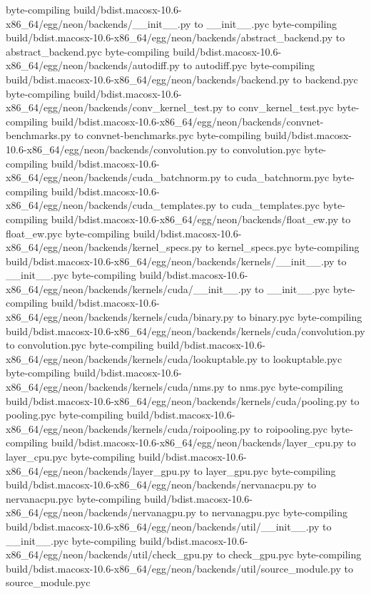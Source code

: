 byte-compiling build/bdist.macosx-10.6-x86_64/egg/neon/backends/__init__.py to __init__.pyc
byte-compiling build/bdist.macosx-10.6-x86_64/egg/neon/backends/abstract_backend.py to abstract_backend.pyc
byte-compiling build/bdist.macosx-10.6-x86_64/egg/neon/backends/autodiff.py to autodiff.pyc
byte-compiling build/bdist.macosx-10.6-x86_64/egg/neon/backends/backend.py to backend.pyc
byte-compiling build/bdist.macosx-10.6-x86_64/egg/neon/backends/conv_kernel_test.py to conv_kernel_test.pyc
byte-compiling build/bdist.macosx-10.6-x86_64/egg/neon/backends/convnet-benchmarks.py to convnet-benchmarks.pyc
byte-compiling build/bdist.macosx-10.6-x86_64/egg/neon/backends/convolution.py to convolution.pyc
byte-compiling build/bdist.macosx-10.6-x86_64/egg/neon/backends/cuda_batchnorm.py to cuda_batchnorm.pyc
byte-compiling build/bdist.macosx-10.6-x86_64/egg/neon/backends/cuda_templates.py to cuda_templates.pyc
byte-compiling build/bdist.macosx-10.6-x86_64/egg/neon/backends/float_ew.py to float_ew.pyc
byte-compiling build/bdist.macosx-10.6-x86_64/egg/neon/backends/kernel_specs.py to kernel_specs.pyc
byte-compiling build/bdist.macosx-10.6-x86_64/egg/neon/backends/kernels/__init__.py to __init__.pyc
byte-compiling build/bdist.macosx-10.6-x86_64/egg/neon/backends/kernels/cuda/__init__.py to __init__.pyc
byte-compiling build/bdist.macosx-10.6-x86_64/egg/neon/backends/kernels/cuda/binary.py to binary.pyc
byte-compiling build/bdist.macosx-10.6-x86_64/egg/neon/backends/kernels/cuda/convolution.py to convolution.pyc
byte-compiling build/bdist.macosx-10.6-x86_64/egg/neon/backends/kernels/cuda/lookuptable.py to lookuptable.pyc
byte-compiling build/bdist.macosx-10.6-x86_64/egg/neon/backends/kernels/cuda/nms.py to nms.pyc
byte-compiling build/bdist.macosx-10.6-x86_64/egg/neon/backends/kernels/cuda/pooling.py to pooling.pyc
byte-compiling build/bdist.macosx-10.6-x86_64/egg/neon/backends/kernels/cuda/roipooling.py to roipooling.pyc
byte-compiling build/bdist.macosx-10.6-x86_64/egg/neon/backends/layer_cpu.py to layer_cpu.pyc
byte-compiling build/bdist.macosx-10.6-x86_64/egg/neon/backends/layer_gpu.py to layer_gpu.pyc
byte-compiling build/bdist.macosx-10.6-x86_64/egg/neon/backends/nervanacpu.py to nervanacpu.pyc
byte-compiling build/bdist.macosx-10.6-x86_64/egg/neon/backends/nervanagpu.py to nervanagpu.pyc
byte-compiling build/bdist.macosx-10.6-x86_64/egg/neon/backends/util/__init__.py to __init__.pyc
byte-compiling build/bdist.macosx-10.6-x86_64/egg/neon/backends/util/check_gpu.py to check_gpu.pyc
byte-compiling build/bdist.macosx-10.6-x86_64/egg/neon/backends/util/source_module.py to source_module.pyc
